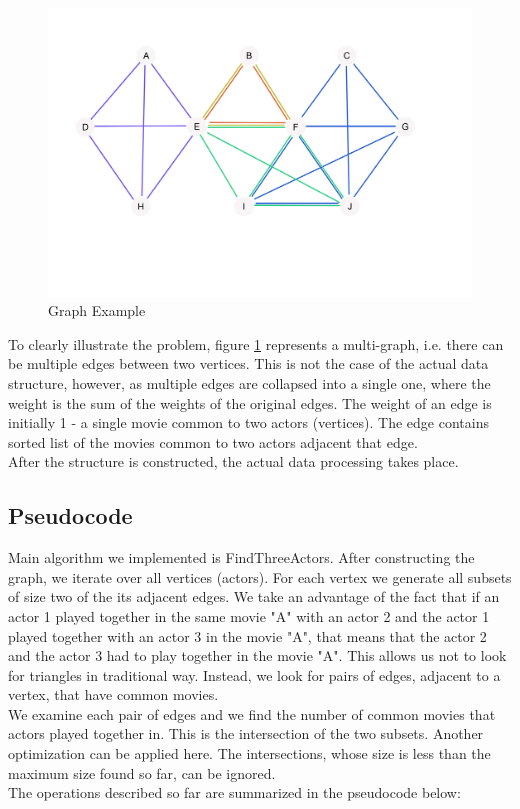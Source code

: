 \begin{figure}[ht!]
\centering
\includegraphics[width=130mm]{resources/project_problem_illustration.png}
\caption{Graph Example}
\label{example}
\end{figure}

To clearly illustrate the problem, figure \ref{example} represents a multi-graph, i.e. there can be multiple edges between two vertices. This is not the case of the actual data structure, however, as multiple edges are collapsed into a single one, where the weight is the sum of the weights of the original edges. The weight of an edge is initially 1 - a single movie common to two actors (vertices). The edge contains sorted list of the movies common to two actors adjacent that edge.
\\
After the structure is constructed, the actual data processing takes place.


\subsection{Pseudocode}
Main algorithm we implemented is FindThreeActors. After constructing the graph, we iterate over all vertices (actors). For each vertex we generate all subsets of size two of the its adjacent edges. We take an advantage of the fact that if an actor 1 played together in the same movie "A" with an actor 2 and the actor 1 played together with an actor 3 in the movie "A", that means that the actor 2 and the actor 3 had to play together in the movie "A". This allows us not to look for triangles in traditional way. Instead, we look for pairs of edges, adjacent to a vertex, that have common movies.
\\
We examine each pair of edges and we find the number of common movies that actors played together in. This is the intersection of the two subsets. Another optimization can be applied here. The intersections, whose size is less than the maximum size found so far, can be ignored.
\\
The operations described so far are summarized in the pseudocode below:

